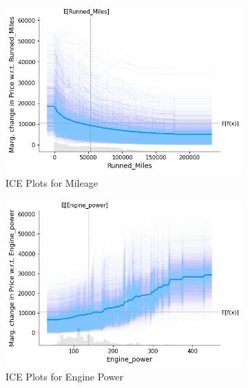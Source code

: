 \documentclass[12pt]{article}
\begin{document}
\FloatBarrier
\begin{figure}[h]
  \centering
  \begin{subfigure}{0.32\textwidth}
    \includegraphics[width=\linewidth]{ice_runnedmiles.png}
    \caption{ICE Plots for Mileage}
    \label{ice_runnedmiles}
  \end{subfigure}
  \medskip
    \begin{subfigure}{0.32\textwidth}
    \includegraphics[width=\linewidth]{ice_enginepower.png}
    \caption{ICE Plots for Engine Power}
    \label{ice_enginepower}
  \end{subfigure}
  \medskip
  \begin{subfigure}{0.32\textwidth}

\end{subfigure}
\end{figure}
\end{document}
